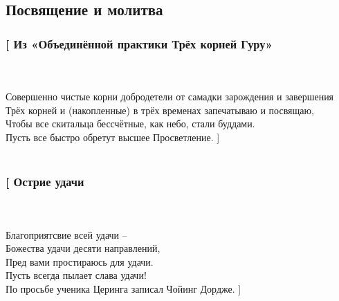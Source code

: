 \subsection*{Посвящение и молитва}
\vspace{1cm}
\subsubsection*{[ Из «Объединённой практики Трёх корней Гуру»}\\
\\
Совершенно чистые корни добродетели от самадки зарождения и завершения\\
Трёх корней и (накопленные) в трёх временах запечатываю и посвящаю,\\
Чтобы все скитальца бессчётные, как небо, стали буддами.\\
Пусть все быстро обретут высшее Просветление. ]\\
\\
\subsubsection*{[ Острие удачи}\\
\\
Благоприятсвие всей удачи – \\
Божества удачи десяти направлений,\\
Пред вами простираюсь для удачи.\\
Пусть всегда пылает слава удачи!\\
\scriptsize
По просьбе ученика Церинга записал Чойинг Дордже.
\normalsize
 ]\\
\\
